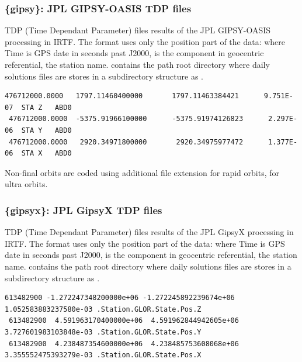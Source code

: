 \subsubsection{\{gipsy\}: JPL GIPSY-OASIS TDP files}

TDP (Time Dependant Parameter) files results of the JPL GIPSY-OASIS processing in IRTF. The format uses only the position part of the data:  where Time is GPS date in seconds past J2000,  is the component in geocentric referential,  the station name.  contains the path root directory where daily solutions files are stores in a subdirectory structure as .

\begin{lstlisting}[language={},title=GIPSY-OASIS TDP format example]
 476712000.0000   1797.11460400000       1797.11463384421      9.751E-07  STA Z   ABD0
 476712000.0000  -5375.91966100000      -5375.91974126823      2.297E-06  STA Y   ABD0
 476712000.0000   2920.34971800000       2920.34975977472      1.377E-06  STA X   ABD0
\end{lstlisting}

Non-final orbits are coded using additional file extension  for rapid orbits,  for ultra orbits.

\subsubsection{\{gipsyx\}: JPL GipsyX TDP files}

TDP (Time Dependant Parameter) files results of the JPL GipsyX processing in IRTF. The format uses only the position part of the data:  where Time is GPS date in seconds past J2000,  is the component in geocentric referential,  the station name.  contains the path root directory where daily solutions files are stores in a subdirectory structure as .

\begin{lstlisting}[language={},title=GipsyX TDP format example]
 613482900 -1.272247348200000e+06 -1.272245892239674e+06  1.052583883237580e-03 .Station.GLOR.State.Pos.Z
 613482900  4.591963170400000e+06  4.591962844942605e+06  3.727601983103848e-03 .Station.GLOR.State.Pos.Y
 613482900  4.238487354600000e+06  4.238485753608068e+06  3.355552475393279e-03 .Station.GLOR.State.Pos.X
\end{lstlisting}

